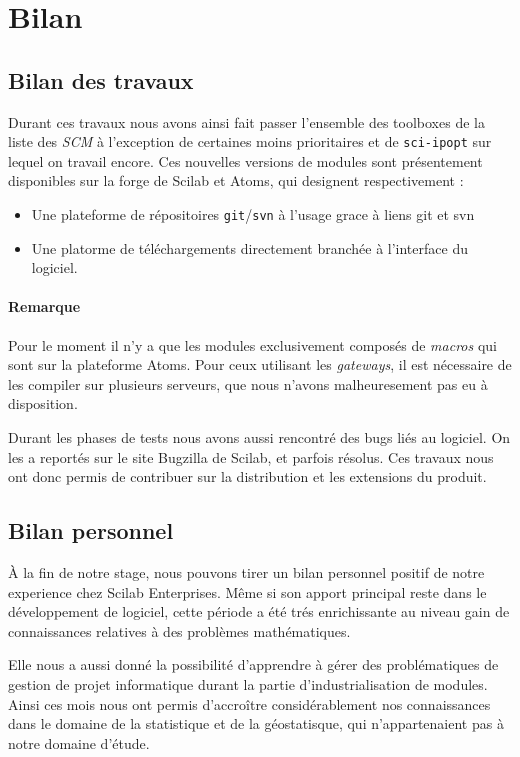 \section*{Bilan}

\subsection*{Bilan des travaux}
Durant ces travaux nous avons ainsi fait passer l’ensemble des toolboxes
de la liste des {\it SCM} \`a l’exception de certaines moins prioritaires
et de {\tt sci-ipopt} sur lequel on travail encore.
Ces nouvelles versions de modules sont présentement disponibles
sur la forge de Scilab et Atoms, qui designent respectivement :

\begin{itemize}
    \item Une plateforme de r\'epositoires {\tt git}/{\tt svn} \`a l'usage
        grace à liens git et svn
    \item Une platorme de téléchargements directement branch\'ee à
        l'interface du logiciel.
\end{itemize}

\paragraph{Remarque}
Pour le moment il n'y a que les modules exclusivement composés
de {\it macros} qui sont sur la plateforme Atoms.
Pour ceux utilisant les {\it gateways}, il est nécessaire de les
compiler sur plusieurs serveurs, que nous n'avons malheuresement
pas eu à disposition.

Durant les phases de tests nous avons aussi rencontré des bugs liés
au logiciel.
On les a reportés sur le site Bugzilla de Scilab, et parfois résolus.
Ces travaux nous ont donc permis de contribuer sur la distribution
et les extensions du produit.

\subsection*{Bilan personnel}

\`A la fin de notre stage, nous pouvons tirer un bilan personnel positif
de notre experience chez {\sc Scilab Enterprises}.
Même si son apport principal reste dans le d\'eveloppement de logiciel,
cette période a été trés enrichissante au niveau gain de connaissances
relatives à des probl\`emes mathématiques.

Elle nous a aussi donn\'e la possibilité d'apprendre à gérer des
problématiques de gestion de projet informatique durant la
partie d'industrialisation de modules.
Ainsi ces mois nous ont permis d'accro\^itre considérablement nos
connaissances dans le domaine de la statistique et de la géostatisque,
qui n'appartenaient pas à notre domaine d'étude.

